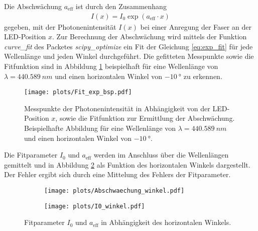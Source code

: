 Die Abschwächung $a_\mathrm{eff}$ ist durch den Zusammenhang 
\begin{align}
    I(x) = I_{0} \exp(a_\mathrm{eff} \cdot x)
    \label{eq:exp_fit}
\end{align}
gegeben, mit der Photonenintensität $I(x)$ bei einer Anregung der Faser an der LED-Position $x$. Zur Berechnung der Abschwächung wird mittels der Funktion \textit{curve\_fit} des Packetes \textit{scipy\_optimize} ein Fit der Gleichung \eqref{eq:exp_fit} für jede Wellenlänge und jeden Winkel durchgeführt. Die gefitteten Messpunkte sowie die Fitfunktion sind in Abbildung \ref{fig:Fit_exp_bsp} beispielhaft für eine Wellenlänge von $\lambda = \SI{440.589}{nm}$ und einen horizontalen Winkel von $\SI{-10}{°}$ zu erkennen.
\begin{figure}
    \centering
    \texttt{[image: plots/Fit\_exp\_bsp.pdf]}
    \caption{Messpunkte der Photonenintensität in Abhängigkeit von der LED-Position $x$, sowie die Fitfunktion zur Ermittlung der Abschwächung. Beispielhafte Abbildung für eine Wellenlänge von $\lambda = \SI{440.589}{nm}$ und einen horizontalen Winkel von $\SI{-10}{°}$.}
    \label{fig:Fit_exp_bsp}
\end{figure}
\FloatBarrier
Die Fitparameter $I_0$ und $a_\mathrm{eff}$ werden im Anschluss über die Wellenlängen gemittelt und in Abbildung \ref{fig:a_I0_winkel} als Funktion des horizontalen Winkels dargestellt. Der Fehler ergibt sich durch eine Mittelung des Fehlers der Fitparameter.
\begin{figure}
    \begin{subfigure}[c]{0.5\textwidth}    
        \texttt{[image: plots/Abschwaechung\_winkel.pdf]}
    \end{subfigure}
    \begin{subfigure}[c]{0.5\textwidth}
        \texttt{[image: plots/I0\_winkel.pdf]}
    \end{subfigure}
    \caption{Fitparameter $I_0$ und $a_\mathrm{eff}$ in Abhängigkeit des horizontalen Winkels.}
    \label{fig:a_I0_winkel}
\end{figure}

